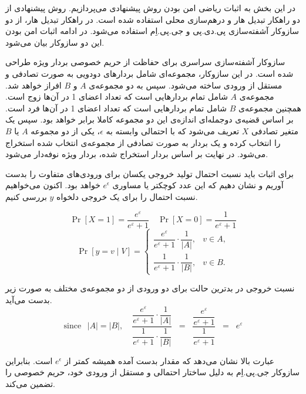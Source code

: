 
در این بخش به اثبات ریاضی امن بودن روش پیشنهادی می‌پردازیم. روش پیشنهادی از دو راهکار تبدیل هار و درهم‌سازی محلی استفاده شده است. در راهکار تبدیل هار، از دو سازوکار آشفته‌سازی پی.دی.پی و جی.پی.اِم استفاده می‌شود. در ادامه اثبات امن بودن این دو سازوکار بیان می‌شود.


سازوکار آشفته‌سازی سراسری برای حفاظت از حریم خصوصی بردار ویژه طراحی شده است. در این سازوکار، مجموعه‌ای شامل بردارهای دودویی به صورت تصادفی و مستقل از ورودی ساخته می‌شود. سپس به دو مجموعه‌ی $A$ و $B$ افراز خواهد شد. مجموعه‌ی $A$ شامل تمام بردارهایی است که تعداد اعضای 1 در آن‌ها زوج است. همچنین مجموعه‌ی $B$ شامل تمام بردارهایی است که تعداد اعضای 1 در آن‌ها فرد است. بر اساس قضیه‌ی دوجمله‌ای اندازه‌ی این دو مجموعه کاملا برابر خواهد بود. سپس یک متغیر تصادفی $X$ تعریف می‌شود که با احتمالی وابسته به $\epsilon$، یکی از دو مجموعه $A$ یا $B$ را انتخاب کرده و یک بردار به صورت تصادفی از مجموعه‌ی انتخاب شده استخراج می‌شود. در نهایت بر اساس بردار استخراج شده، بردار ویژه نوفه‌دار می‌شود.
 
برای اثبات باید نسبت احتمال تولید خروجی یکسان برای ورودی‌های متفاوت را بدست آوریم و نشان دهیم که این عدد کوچکتر یا مساوری $e ^ \epsilon$ خواهد بود. اکنون می‌خواهیم نسبت احتمال را برای یک خروجی دلخواه $y$ بررسی کنیم.

$$\Pr[X = 1] = \frac{e^{\varepsilon}}{e^{\varepsilon} + 1}
\quad
\Pr[X = 0] = \frac{1}{e^{\varepsilon} + 1}$$
$$
\Pr[y = v \mid V] =
\begin{cases}
\dfrac{e^{\varepsilon}}{e^{\varepsilon}+1} \cdot \dfrac{1}{|A|}, & v \in A, \\[10pt]
\dfrac{1}{e^{\varepsilon}+1} \cdot \dfrac{1}{|B|}, & v \in B .
\end{cases}$$

نسبت خروجی در بدترین حالت برای دو ورودی از دو مجموعه‌ی مختلف به صورت زیر بدست‌ می‌آید.
$$
\text{since } \hspace{5pt} |A| = |B|, \quad
\frac{\dfrac{e^{\varepsilon}}{e^{\varepsilon}+1}\cdot \dfrac{1}{|A|}}
     {\dfrac{1}{e^{\varepsilon}+1}\cdot \dfrac{1}{|B|}}
\;\;=\;\;
\frac{\dfrac{e^{\varepsilon}}{e^{\varepsilon}+1}}
     {\dfrac{1}{e^{\varepsilon}+1}}
\;\;=\;\; e^{\varepsilon}
$$

عبارت بالا نشان می‌دهد که مقدار بدست آمده همیشه کمتر از $e ^ \epsilon$ است. بنابراین سازوکار جی.پی.اِم به دلیل ساختار احتمالی و مستقل از ورودی خود، حریم خصوصی را تضمین می‌کند.


